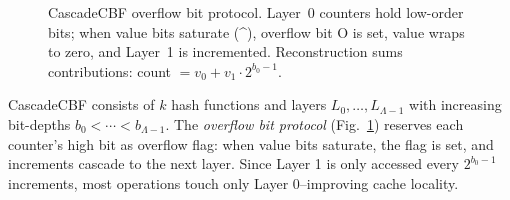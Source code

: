 \documentclass[agile, final]{copernicus-agile}
\begin{document}
\begin{figure}[ht]






\caption{CascadeCBF overflow bit protocol. Layer~0 counters hold low-order bits; when value bits saturate (\^{}), overflow bit O is set, value wraps to zero, and Layer~1 is incremented. Reconstruction sums contributions: count $= v_0 + v_1 \cdot 2^{b_0-1}$.}
\label{fig:architecture}
\end{figure}

CascadeCBF consists of $k$ hash functions and layers $L_0, \ldots, L_{\Lambda-1}$ with increasing bit-depths $b_0 < \cdots < b_{\Lambda-1}$. The \emph{overflow bit protocol} (Fig.~\ref{fig:architecture}) reserves each counter's high bit as overflow flag: when value bits saturate, the flag is set, and increments cascade to the next layer. Since Layer 1 is only accessed every $2^{b_0-1}$ increments, most operations touch only Layer 0--improving cache locality.
\end{document}
